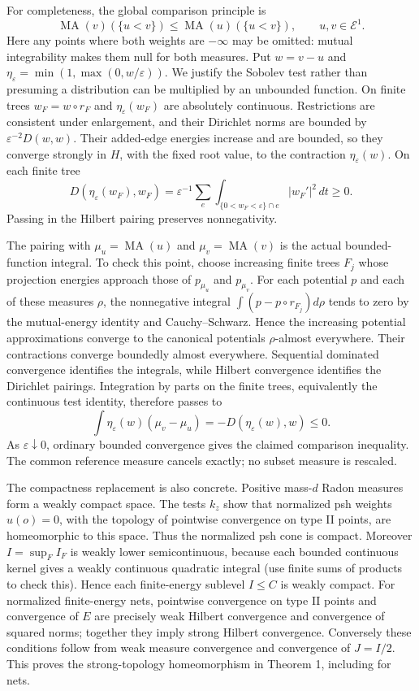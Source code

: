\documentclass[
  11pt,
]{article}
\begin{document}
For completeness, the global comparison principle is \[
\operatorname{MA}(v)(\{u<v\})\leq
\operatorname{MA}(u)(\{u<v\}),\qquad u,v\in\mathcal E^1.
\] Here any points where both weights are \(-\infty\) may be omitted:
mutual integrability makes them null for both measures. Put \(w=v-u\)
and \(\eta_\varepsilon=\min(1,\max(0,w/\varepsilon))\). We justify the
Sobolev test rather than presuming a distribution can be multiplied by
an unbounded function. On finite trees \(w_F=w\circ r_F\) and
\(\eta_\varepsilon(w_F)\) are absolutely continuous. Restrictions are
consistent under enlargement, and their Dirichlet norms are bounded by
\(\varepsilon^{-2}D(w,w)\). Their added-edge energies increase and are
bounded, so they converge strongly in \(H\), with the fixed root value,
to the contraction \(\eta_\varepsilon(w)\). On each finite tree \[
D(\eta_\varepsilon(w_F),w_F)
=\varepsilon^{-1}\sum_e\int_{\{0<w_F<\varepsilon\}\cap e}|w_F'|^2\,dt\geq0.
\] Passing in the Hilbert pairing preserves nonnegativity.

The pairing with \(\mu_u=\operatorname{MA}(u)\) and
\(\mu_v=\operatorname{MA}(v)\) is the actual bounded-function integral.
To check this point, choose increasing finite trees \(F_j\) whose
projection energies approach those of \(p_{\mu_u}\) and \(p_{\mu_v}\).
For each potential \(p\) and each of these measures \(\rho\), the
nonnegative integral \(\int(p-p\circ r_{F_j})d\rho\) tends to zero by
the mutual-energy identity and Cauchy--Schwarz. Hence the increasing
potential approximations converge to the canonical potentials
\(\rho\)-almost everywhere. Their contractions converge boundedly almost
everywhere. Sequential dominated convergence identifies the integrals,
while Hilbert convergence identifies the Dirichlet pairings. Integration
by parts on the finite trees, equivalently the continuous test identity,
therefore passes to \[
\int\eta_\varepsilon(w)(\mu_v-\mu_u)
=-D(\eta_\varepsilon(w),w)\leq0.
\] As \(\varepsilon\downarrow0\), ordinary bounded convergence gives the
claimed comparison inequality. The common reference measure cancels
exactly; no subset measure is rescaled.

The compactness replacement is also concrete. Positive mass-\(d\) Radon
measures form a weakly compact space. The tests \(k_z\) show that
normalized psh weights \(u(o)=0\), with the topology of pointwise
convergence on type II points, are homeomorphic to this space. Thus the
normalized psh cone is compact. Moreover \(I=\sup_F I_F\) is weakly
lower semicontinuous, because each bounded continuous kernel gives a
weakly continuous quadratic integral (use finite sums of products to
check this). Hence each finite-energy sublevel \(I\leq C\) is weakly
compact. For normalized finite-energy nets, pointwise convergence on
type II points and convergence of \(E\) are precisely weak Hilbert
convergence and convergence of squared norms; together they imply strong
Hilbert convergence. Conversely these conditions follow from weak
measure convergence and convergence of \(J=I/2\). This proves the
strong-topology homeomorphism in Theorem 1, including for nets.
\end{document}
